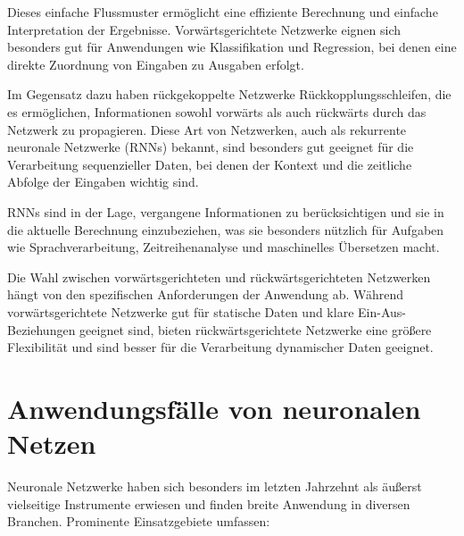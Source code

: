 Dieses einfache Flussmuster ermöglicht eine effiziente Berechnung und einfache Interpretation der Ergebnisse. Vorwärtsgerichtete Netzwerke eignen sich besonders gut für Anwendungen wie Klassifikation und Regression, bei denen eine direkte Zuordnung von Eingaben zu Ausgaben erfolgt.

Im Gegensatz dazu haben rückgekoppelte Netzwerke Rückkopplungsschleifen, die es ermöglichen, Informationen sowohl vorwärts als auch rückwärts durch das Netzwerk zu propagieren. Diese Art von Netzwerken, auch als rekurrente neuronale Netzwerke (RNNs) bekannt, sind besonders gut geeignet für die Verarbeitung sequenzieller Daten, bei denen der Kontext und die zeitliche Abfolge der Eingaben wichtig sind.

RNNs sind in der Lage, vergangene Informationen zu berücksichtigen und sie in die aktuelle Berechnung einzubeziehen, was sie besonders nützlich für Aufgaben wie Sprachverarbeitung, Zeitreihenanalyse und maschinelles Übersetzen macht.

Die Wahl zwischen vorwärtsgerichteten und rückwärtsgerichteten Netzwerken hängt von den spezifischen Anforderungen der Anwendung ab. Während vorwärtsgerichtete Netzwerke gut für statische Daten und klare Ein-Aus-Beziehungen geeignet sind, bieten rückwärtsgerichtete Netzwerke eine größere Flexibilität und sind besser für die Verarbeitung dynamischer Daten geeignet.

\section{Anwendungsfälle von neuronalen Netzen}
\label{sec:Grundlagen_Anwendungsfälle}

Neuronale Netzwerke haben sich besonders im letzten Jahrzehnt als äußerst vielseitige Instrumente erwiesen und finden breite Anwendung in diversen Branchen. Prominente Einsatzgebiete umfassen:


